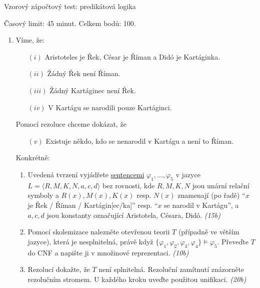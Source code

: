 \documentclass[a4paper]{article}
\begin{document}
\begin{center}
    \large{Vzorový zápočtový test: predikátová logika}    
\end{center}

Časový limit: 45 minut. Celkem bodů: 100.

\bigskip

\begin{enumerate}

\item Víme, že:
\begin{enumerate}
    \item[$(i)$] Aristoteles je Řek, César je Říman a Didó je Kartáginka.
    \item[$(ii)$] Žádný Řek není Říman.
    \item[$(iii)$] Žádný Kartáginec není Řek.
    \item[$(iv)$] V Kartágu se narodili pouze Kartáginci.
\end{enumerate}
    
Pomocí rezoluce chceme dokázat, že
    
\begin{enumerate}
    \item[$(v)$] Existuje někdo, kdo se nenarodil v Kartágu a není to Říman.
\end{enumerate}
    
Konkrétně:
\begin{enumerate}
\item Uvedená tvrzení vyjádřete \underline{sentencemi} $\varphi_1, \dots, \varphi_5$ v jazyce $L=\langle R, M, K, N, a, c, d \rangle$ bez rovnosti, kde $R, M, K, N$ jsou unární relační symboly a $R(x), M(x), K(x)$ resp. $N(x)$ znamenají (po řadě) ``$x$ je Řek / Říman / Kartágin[ec/ka]'' resp. ``$x$ se narodil v Kartágu'', a $a, c, d$ jsou konstanty označující Aristotela, Césara, Didó. {\it (15b)}
    \item Pomocí skolemizace nalezněte otevřenou teorii $T$ (případně ve větším jazyce), která je nesplnitelná, právě když  $\{\varphi_1, \varphi_2, \varphi_3, \varphi_4\} \models \varphi_5$. Převeďte $T$ do CNF a napište ji v množinové reprezentaci. {\it (10b)}
    \item Rezolucí dokažte, že $T$ není splnitelná. Rezoluční zamítnutí znázorněte rezolučním stromem. U každého kroku uveďte použitou unifikaci. {\it (20b)}
    \end{enumerate}


\end{enumerate}
\end{document}
